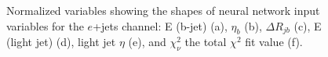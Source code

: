 \begin{figure}[h!]
\vspace{-4.5mm}
\hfil
{}
\caption{Normalized variables showing the shapes of neural network input variables for the $e$+jets channel: E (b-jet) (a), $\eta_b$ (b), $\Delta R_{jb}$ (c), E (light jet) (d), light jet $\eta$ (e), and $\chi^2_\nu$ the total $\chi^2$ fit value (f).  }
\label{fig:VarPlotsej4}
\end{figure}


